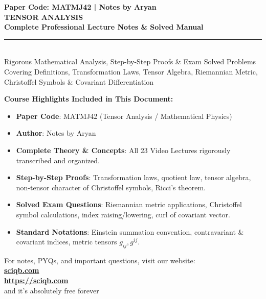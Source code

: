 \documentclass[11pt,a4paper]{article}
\begin{document}
\begin{titlepage}
    \centering
    \vspace*{0.5cm}
    {\large\sffamily\color{secondary}\textbf{Paper Code: MATMJ42 | Notes by Aryan}}\\[1cm]
    {\Huge\bfseries\color{primary} TENSOR ANALYSIS}\\[0.4cm]
    {\Large\bfseries\color{secondary} Complete Professional Lecture Notes \& Solved Manual}\\[0.8cm]
    \rule{0.8\textwidth}{1.5pt}\\[1cm]
    {\large\sffamily Rigorous Mathematical Analysis, Step-by-Step Proofs \& Exam Solved Problems}\\[0.4cm]
    {\small\sffamily Covering Definitions, Transformation Laws, Tensor Algebra, Riemannian Metric, Christoffel Symbols \& Covariant Differentiation}\\[1.2cm]
    
    \begin{tcolorbox}[colback=accent!20,colframe=primary,arc=6pt,width=0.85\textwidth,halign=left]
    \textbf{\color{primary} Course Highlights Included in This Document:}
    \begin{itemize}[leftmargin=1.5em]
        \item \textbf{Paper Code}: MATMJ42 (Tensor Analysis / Mathematical Physics)
        \item \textbf{Author}: Notes by Aryan
        \item \textbf{Complete Theory \& Concepts}: All 23 Video Lectures rigorously transcribed and organized.
        \item \textbf{Step-by-Step Proofs}: Transformation laws, quotient law, tensor algebra, non-tensor character of Christoffel symbols, Ricci's theorem.
        \item \textbf{Solved Exam Questions}: Riemannian metric applications, Christoffel symbol calculations, index raising/lowering, curl of covariant vector.
        \item \textbf{Standard Notations}: Einstein summation convention, contravariant \& covariant indices, metric tensors $g_{ij}, g^{ij}$.
    \end{itemize}
    \end{tcolorbox}
    \vfill
    {\large\sffamily For notes, PYQs, and important questions, visit our website:}\\[0.3cm]
    {\Huge\bfseries\color{primary} \href{https://sciqb.com}{sciqb.com}}\\[0.2cm]
    {\large\bfseries\color{secondary} \url{https://sciqb.com}}\\[0.2cm]
    {\large\sffamily and it's absolutely free forever}\\
    \vspace*{0.5cm}
\end{titlepage}
\end{document}
